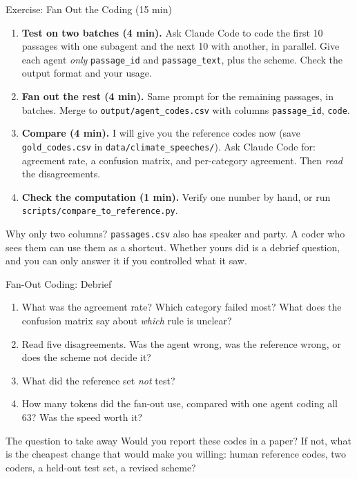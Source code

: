 \documentclass[aspectratio=169, 11pt]{beamer}
\begin{document}
\begin{frame}[fragile]{Exercise: Fan Out the Coding (15 min)}
  \small
  \begin{enumerate}
    \item \textbf{Test on two batches (4 min).} Ask Claude Code to code the first 10 passages with one subagent and the next 10 with another, in parallel. Give each agent \emph{only} \texttt{passage\_id} and \texttt{passage\_text}, plus the scheme. Check the output format and your usage.
    \item \textbf{Fan out the rest (4 min).} Same prompt for the remaining passages, in batches. Merge to \texttt{output/agent\_codes.csv} with columns \texttt{passage\_id}, \texttt{code}.
    \item \textbf{Compare (4 min).} I will give you the reference codes now (save \texttt{gold\_codes.csv} in \texttt{data/climate\_speeches/}). Ask Claude Code for: agreement rate, a confusion matrix, and per-category agreement. Then \emph{read} the disagreements.
    \item \textbf{Check the computation (1 min).} Verify one number by hand, or run \texttt{scripts/compare\_to\_reference.py}.
  \end{enumerate}

  \vspace{0.3em}
  \begin{alertblock}{Why only two columns?}
    \texttt{passages.csv} also has speaker and party. A coder who sees them can use them as a shortcut. Whether yours did is a debrief question, and you can only answer it if you controlled what it saw.
  \end{alertblock}
\end{frame}

\begin{frame}{Fan-Out Coding: Debrief}
  \begin{enumerate}
    \item What was the agreement rate? Which category failed most? What does the confusion matrix say about \emph{which} rule is unclear?
    \item Read five disagreements. Was the agent wrong, was the reference wrong, or does the scheme not decide it?
    \item What did the reference set \emph{not} test?
    \item How many tokens did the fan-out use, compared with one agent coding all 63? Was the speed worth it?
  \end{enumerate}

  \vspace{0.5em}
  \begin{block}{The question to take away}
    Would you report these codes in a paper? If not, what is the cheapest change that would make you willing: human reference codes, two coders, a held-out test set, a revised scheme?
  \end{block}
\end{frame}
\end{document}
